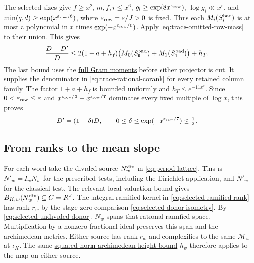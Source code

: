 The selected sizes give \(f\ge x^2\), \(m,f,r\le x^6\),
\(g_i\ge\exp(8x^{\varepsilon_{\rm row}})\),
\(\log g_i\ll x^\varepsilon\), and
\(\min(q,d)\ge\exp(x^{\varepsilon_{\rm row}/6})\), where
\(\varepsilon_{\rm row}=\varepsilon/J>0\) is fixed.
Thus each \(M_i(S_i^{\rm bad})\) is at most a polynomial in \(x\)
times \(\exp(-x^{\varepsilon_{\rm row}/6})\).
Apply \eqref{eq:trace-omitted-row-mass} to their union. This gives
\[
 \frac{D-D'}D\le
 2(1+a+h_f)\bigl(M_0(S_0^{\rm bad})+M_1(S_1^{\rm bad})\bigr)+h_T .
\]
The last bound uses the \hyperlink{proof.full-moment-dimension}{full
Gram moments} before either projector is cut. It supplies the
denominator in \eqref{eq:trace-rational-corank} for every retained
column family.
The factor \(1+a+h_f\) is bounded uniformly and
\(h_T\le e^{-11x^\varepsilon}\). Since
\(0<\varepsilon_{\rm row}\le\varepsilon\) and
\(x^{\varepsilon_{\rm row}/6}-x^{\varepsilon_{\rm row}/7}\) dominates
every fixed multiple of \(\log x\), this proves
\begin{equation}
 \label{eq:trace-row-fraction}
 D'=(1-\delta)D,\qquad
 0\le\delta\le\exp(-x^{\varepsilon_{\rm row}/7})\le\tfrac12 .
\end{equation}

\subsection{From ranks to the mean slope}
\leavevmode{}%
For each word take the divided source \(N_w^{\rm div}\) in
\eqref{eq:period-lattice}. This is \(N'_w=I_wN_w\) for the prescribed
tests, including the Dirichlet application, and
\(\widetilde N'_w\) for the classical test. The relevant local valuation
bound gives \(B_{K,w}(N_w^{\rm div})\subseteq C=R^\vee\).
The integral ramified kernel in \eqref{eq:selected-ramified-rank}
has rank \(r_w\) by the stage-zero comparison
\eqref{eq:selected-donor-isometry}. By \eqref{eq:selected-undivided-donor},
\(N_w\) spans that rational ramified space. Multiplication by a nonzero fractional ideal
preserves this span and the archimedean metrics. Either source
has rank \(r_w\) and complexifies to the same \(\mathcal M_w\) at
\(\iota_K\). The same
\hyperlink{proof.divided-map-heights}{squared-norm archimedean height bound}
\(h_w\) therefore applies to the map on either source.

